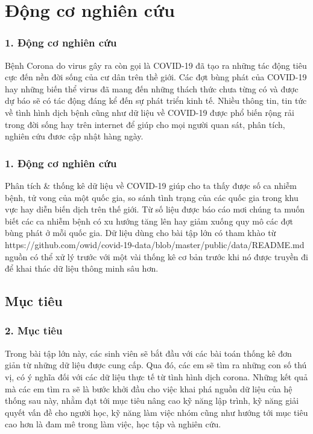 \documentclass[english,10pt,table]{beamer}
\begin{document}
\section{Động cơ nghiên cứu}
\frame
{
  \frametitle{1. Động cơ nghiên cứu}	
Bệnh Corona do virus gây ra còn gọi là COVID-19 đã tạo ra những tác động tiêu cực đến nền đời
sống của cư dân trên thề giới. Các đợt bùng phát của COVID-19 hay những biến thể virus đã mang đến
những thách thức chưa từng có và được dự báo sẽ có tác động đáng kể đến sự phát triển kinh tế. Nhiều
thông tin, tin tức về tình hình dịch bệnh cũng như dữ liệu về COVID-19 được phổ biến rộng rải trong
đời sống hay trên internet để giúp cho mọi người quan sát, phân tích, nghiên cứu đươc cập nhật hàng
ngày.
}
\begin{frame}
\frametitle{1. Động cơ nghiên cứu}
Phân tích & thống kê dữ liệu về COVID-19 giúp cho ta thấy được số ca nhiễm bệnh, tử vong
của một quốc gia, so sánh tình trạng của các quốc gia trong khu vực hay diễn biến dịch trên thế
giới. Từ số liệu được báo cáo mơi chúng ta muốn biết các ca nhiễm bệnh có xu hướng tăng lên hay
giảm xuống quy mô các đợt bùng phát ở mỗi quốc gia. Dữ liệu dùng cho bài tập lớn có tham khào từ
https://github.com/owid/covid-19-data/blob/master/public/data/README.md nguồn có thể xử lý
trước với một vài thống kê cơ bản trước khi nó được truyền đi để khai thác dữ liệu thông minh sâu hơn.
\end{frame}
\begin{frame}
\section{Mục tiêu}
\frametitle{2. Mục tiêu}
Trong bài tập lớn này, các sinh viên sẽ bắt đầu với các bài toán thống kê đơn giản từ những dữ liệu
được cung cấp. Qua đó, các em sẽ tìm ra những con số thú vị, có ý nghĩa đối với các dữ liệu thực tế từ
tình hình dịch corona. Những kết quả mà các em tìm ra sẽ là bước khởi đầu cho việc khai phá nguồn dữ
liệu của hệ thống sau này, nhằm đạt tới mục tiêu nâng cao kỹ năng lập trình, kỹ năng giải quyết vấn đề
cho người học, kỹ năng làm việc nhóm cũng như hướng tới mục tiêu cao hơn là đam mê trong làm việc,
học tập và nghiên cứu.
\end{frame}
\end{document}
